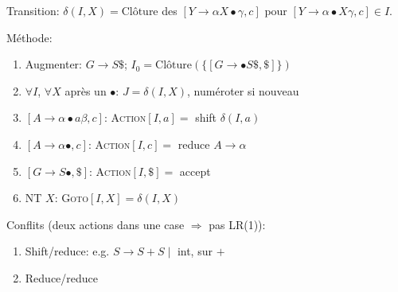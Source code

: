 \documentclass[12pt, a4paper]{article}
\newcommand{\Clo}{\textrm{Clôture}}
\begin{document}
\begin{multicols*}{3}
	Transition: $\delta(I,X)=\Clo$ des $[Y\rightarrow\alpha X\bullet\gamma,c]$ pour $[Y\rightarrow\alpha\bullet X\gamma,c]\in I$.
 
	Méthode:
	\begin{enumerate}[\roman*.]
		\item Augmenter: $G\rightarrow S\$$; $I_0=\Clo(\{[G\rightarrow\bullet S\$,\$]\})$
		\item $\forall I$, $\forall X$ après un $\bullet$: $J=\delta(I,X)$, numéroter si nouveau
		\item $[A\rightarrow\alpha\bullet a\beta,c]$: \textsc{Action}$[I,a]=$ shift $\delta(I,a)$
		\item $[A\rightarrow\alpha\bullet,c]$: \textsc{Action}$[I,c]=$ reduce $A\rightarrow\alpha$
		\item $[G\rightarrow S\bullet,\$]$: \textsc{Action}$[I,\$]=$ accept
		\item NT $X$: \textsc{Goto}$[I,X]=\delta(I,X)$
	\end{enumerate}
 
	Conflits (deux actions dans une case $\Rightarrow$ pas LR(1)):
	\begin{enumerate}[\roman*.]
		\item Shift/reduce: e.g. $S\rightarrow S+S\mid$ int, sur $+$
		\item Reduce/reduce
	\end{enumerate}
 

\end{multicols*}
\end{document}
